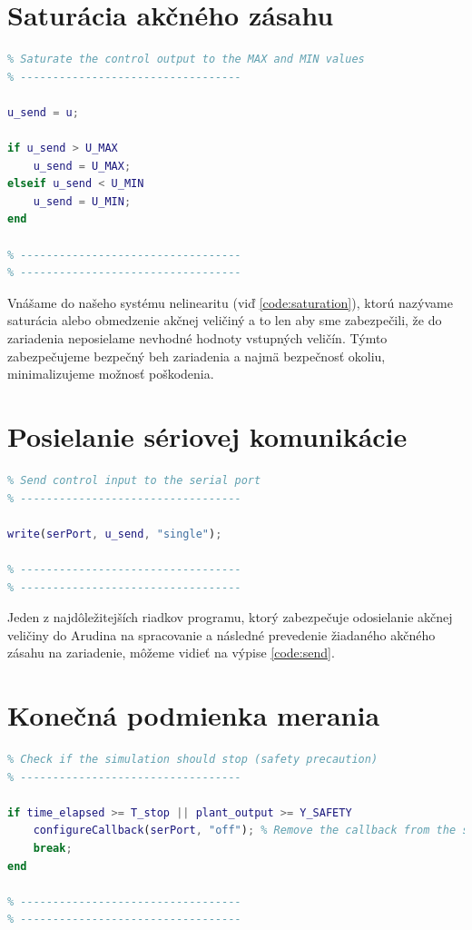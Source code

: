 \documentclass[a4paper, 10pt, ]{article}
\begin{document}
\section{Saturácia akčného zásahu}
\begin{lstlisting}[caption=Obmedzenie akčného zásahu na maximálne a minimálne hodnoty., label={code:saturation}, language=Matlab]
% ----------------------------------
% Saturate the control output to the MAX and MIN values
% ----------------------------------

u_send = u;

if u_send > U_MAX
    u_send = U_MAX;
elseif u_send < U_MIN
    u_send = U_MIN;
end

% ----------------------------------
% ----------------------------------
\end{lstlisting}

Vnášame do našeho systému nelinearitu (viď \ref{code:saturation}), ktorú nazývame saturácia alebo obmedzenie akčnej veličiný a to len aby sme zabezpečili, že do zariadenia neposielame nevhodné hodnoty vstupných veličín. Týmto zabezpečujeme bezpečný beh zariadenia a najmä bezpečnosť okoliu, minimalizujeme možnosť poškodenia.

\section{Posielanie sériovej komunikácie}
\begin{lstlisting}[caption=Funkcia na posielanie žiadanej akčnej veličiny po sériovej linke., label={code:send}, language=Matlab]
% ----------------------------------
% Send control input to the serial port
% ----------------------------------

write(serPort, u_send, "single");

% ----------------------------------
% ----------------------------------
\end{lstlisting}

Jeden z najdôležitejších riadkov programu, ktorý zabezpečuje odosielanie akčnej veličiny do Arudina na spracovanie a následné prevedenie žiadaného akčného zásahu na zariadenie, môžeme vidieť na výpise \ref{code:send}.

\section{Konečná podmienka merania}
\begin{lstlisting}[caption=Podmienka na bezpečné ukončenie merania., label={code:safety}, language=Matlab]
% ----------------------------------
% Check if the simulation should stop (safety precaution)
% ----------------------------------

if time_elapsed >= T_stop || plant_output >= Y_SAFETY
    configureCallback(serPort, "off"); % Remove the callback from the serial port, before exiting the loop
    break;
end

% ----------------------------------
% ----------------------------------
\end{lstlisting}
\end{document}
